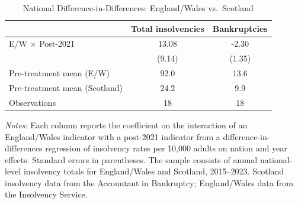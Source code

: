 \begin{table}[htbp]
\centering
\caption{National Difference-in-Differences: England/Wales vs.~Scotland}
\label{tab:national_did}
\begin{tabular}{lcc}
\hline\hline
 & Total insolvencies & Bankruptcies \\
\hline
E/W $\times$ Post-2021 & 13.08 & -2.30 \\
 & (9.14) & (1.35) \\
\addlinespace
Pre-treatment mean (E/W) & 92.0 & 13.6 \\
Pre-treatment mean (Scotland) & 24.2 & 9.9 \\
Observations & 18 & 18 \\
\hline\hline
\end{tabular}
\par\vspace{0.3em}
{\footnotesize \textit{Notes:} Each column reports the coefficient on the interaction of an England/Wales indicator with a post-2021 indicator from a difference-in-differences regression of insolvency rates per 10,000 adults on nation and year effects. Standard errors in parentheses. The sample consists of annual national-level insolvency totals for England/Wales and Scotland, 2015--2023. Scotland insolvency data from the Accountant in Bankruptcy; England/Wales data from the Insolvency Service.}
\end{table}

